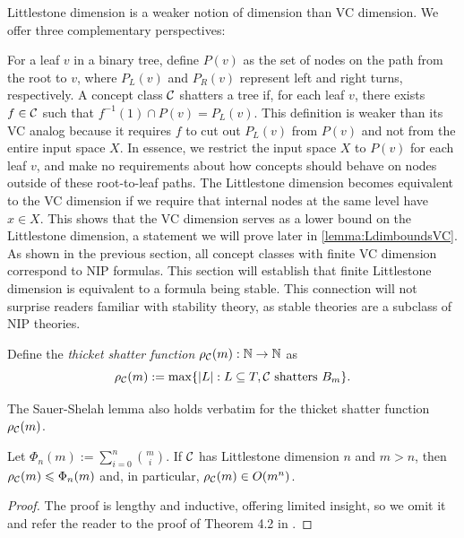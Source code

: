 \begin{remark}
\label{remark:LdimVSVCdim}
Littlestone dimension is a weaker notion of dimension than VC dimension. We offer three complementary perspectives:
\begin{outline}
    \1 For a leaf $v$ in a binary tree, define $P(v)$ as the set of nodes on the path from the root to $v$, where $P_L(v)$ and $P_R(v)$ represent left and right turns, respectively. A concept class $\mathcal{C}$ shatters a tree if, for each leaf $v$, there exists $f\in\mathcal{C}$ such that $f^{-1}(1)\cap P(v) = P_L(v)$. This definition is weaker than its VC analog because it requires $f$ to cut out $P_L(v)$ from $P(v)$ and not from the entire input space $X$. In essence, we restrict the input space $X$ to $P(v)$ for each leaf $v$, and make no requirements about how concepts should behave on nodes outside of these root-to-leaf paths.
    \1 The Littlestone dimension becomes equivalent to the VC dimension if we require that internal nodes at the same level have $x\in X$. This shows that the VC dimension serves as a lower bound on the Littlestone dimension, a statement we will prove later in \cref{lemma:LdimboundsVC}.
    \1 As shown in the previous section, all concept classes with finite VC dimension correspond to NIP formulas. This section will establish that finite Littlestone dimension is equivalent to a formula being stable. This connection will not surprise readers familiar with stability theory, as stable theories are a subclass of NIP theories.
\end{outline}
\end{remark}

\begin{definition}
\label{def:thicketfunc}
    Define the \emph{thicket shatter function} $\rho_{\mathcal{C}}(m):\mathbb{N}\rightarrow\mathbb{N}$ as 
    $$\rho_{\mathcal{C}}(m):= \max \{ |L| : L\subseteq T, \mathcal{C} \text{ shatters } B_m \}.$$
\end{definition}

The Sauer-Shelah lemma   also holds verbatim for the thicket shatter function $\rho_{\mathcal{C}}(m)$.

\begin{lemma}
    \label{lemma:Sauer-Shelah II}
    Let $\Phi_n(m):=\sum^n_{i=0}\binom{m}{i}$. If $\mathcal{C}$ has Littlestone dimension $n$ and $m>n$, then $\rho_{\mathcal{C}}(m) \leqslant \Phi_n(m)$ and, in particular, $\rho_{\mathcal{C}}(m)\in O(m^n)$.
\end{lemma}
\begin{proof}
    The proof is lengthy and inductive, offering limited insight, so we omit it and refer the reader to the proof of Theorem 4.2 in \cite{Bhaskar2021}. 
\end{proof}

